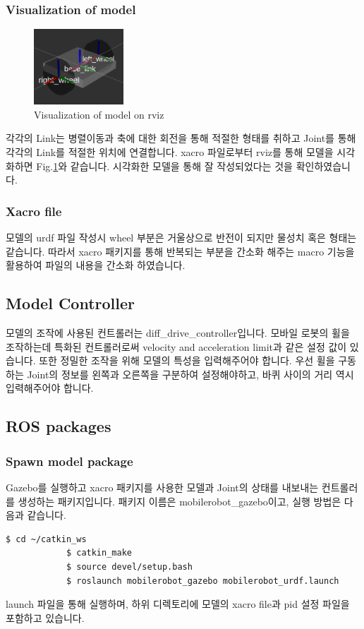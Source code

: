 \documentclass{article}
\begin{document}
			\subsubsection{Visualization of model}
			\begin{figure}[h]
				\centering
				\includegraphics[width=0.3\textwidth]{figures/rviz_model.png}
				\caption{\label{fig:rviz_model}Visualization of model on rviz}
			\end{figure}
			각각의 Link는 병렬이동과 축에 대한 회전을 통해 적절한 형태를 취하고 Joint를 통해 각각의 Link를 적절한 위치에 연결합니다. xacro 파일로부터 rviz를 통해 모델을 시각화하면 Fig.\ref{fig:rviz_model}와 같습니다. 시각화한 모델을 통해 잘 작성되었다는 것을 확인하였습니다.
			
			\subsubsection{Xacro file}
			모델의 urdf 파일 작성시 wheel 부분은 거울상으로 반전이 되지만 물성치 혹은 형태는 같습니다. 따라서 xacro 패키지를 통해 반복되는 부분을 간소화 해주는 macro 기능을 활용하여 파일의 내용을 간소화 하였습니다.

		\subsection{Model Controller}
		모델의 조작에 사용된 컨트롤러는 diff\_drive\_controller입니다. 모바일 로봇의 휠을 조작하는데 특화된 컨트롤러로써 velocity and acceleration limit과 같은 설정 값이 있습니다. 또한 정밀한 조작을 위해 모델의 특성을 입력해주어야 합니다. 우선 휠을 구동하는 Joint의 정보를 왼쪽과 오른쪽을 구분하여 설정해야하고, 바퀴 사이의 거리 역시 입력해주어야 합니다.
			
		\subsection{ROS packages}
			\subsubsection{Spawn model package}
			Gazebo를 실행하고 xacro 패키지를 사용한 모델과 Joint의 상태를 내보내는 컨트롤러를 생성하는 패키지입니다. 패키지 이름은 mobilerobot\_gazebo이고, 실행 방법은 다음과 같습니다.
			\begin{lstlisting}[autogobble=true, frame=single]
			$ cd ~/catkin_ws
			$ catkin_make
			$ source devel/setup.bash
			$ roslaunch mobilerobot_gazebo mobilerobot_urdf.launch
			\end{lstlisting}
			launch 파일을 통해 실행하며, 하위 디렉토리에 모델의 xacro file과 pid 설정 파일을 포함하고 있습니다.
			
\end{document}
